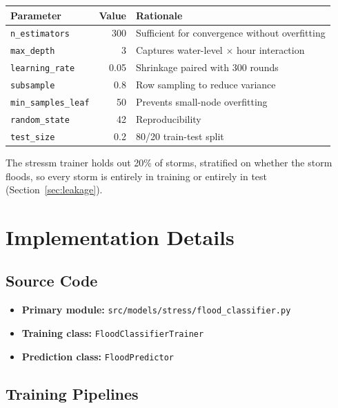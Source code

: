 \documentclass[11pt,a4paper]{article}
\begin{document}
\begin{center}
\begin{tabular}{lrl}
\toprule
\textbf{Parameter} & \textbf{Value} & \textbf{Rationale} \\
\midrule
\texttt{n\_estimators} & 300 & Sufficient for convergence without overfitting \\
\texttt{max\_depth} & 3 & Captures water-level $\times$ hour interaction \\
\texttt{learning\_rate} & 0.05 & Shrinkage paired with 300 rounds \\
\texttt{subsample} & 0.8 & Row sampling to reduce variance \\
\texttt{min\_samples\_leaf} & 50 & Prevents small-node overfitting \\
\texttt{random\_state} & 42 & Reproducibility \\
\texttt{test\_size} & 0.2 & 80/20 train-test split \\
\bottomrule
\end{tabular}
\end{center}

The stressm trainer holds out 20\% of storms, stratified on whether the storm floods,
so every storm is entirely in training or entirely in test
(Section~\ref{sec:leakage}).

\section{Implementation Details}

\subsection{Source Code}
\begin{itemize}[nosep]
    \item \textbf{Primary module:} \texttt{src/models/stress/flood\_classifier.py}
    \item \textbf{Training class:} \texttt{FloodClassifierTrainer}
    \item \textbf{Prediction class:} \texttt{FloodPredictor}
\end{itemize}

\subsection{Training Pipelines}
\end{document}
